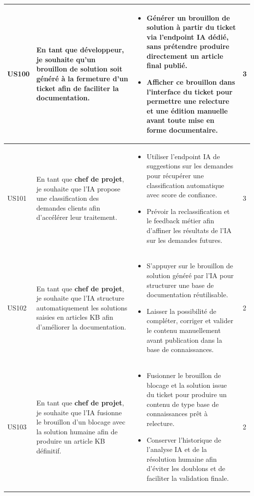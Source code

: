 \begin{longtable}{|C{1cm}|L{5.6cm}|L{8cm}|C{0.85cm}|}
US100 & En tant que \textbf{développeur}, je souhaite qu'un brouillon de solution soit généré à la fermeture d'un ticket afin de faciliter la documentation. &
\begin{itemize}[nosep, left=0pt, label={$\bullet$}]
\item Générer un brouillon de solution à partir du ticket via l'endpoint IA dédié, sans prétendre produire directement un article final publié.
\item Afficher ce brouillon dans l'interface du ticket pour permettre une relecture et une édition manuelle avant toute mise en forme documentaire.
\end{itemize} & 3 \\
\hline

US101 & En tant que \textbf{chef de projet}, je souhaite que l'IA propose une classification des demandes clients afin d'accélérer leur traitement. &
\begin{itemize}[nosep, left=0pt, label={$\bullet$}]
\item Utiliser l'endpoint IA de suggestions sur les demandes pour récupérer une classification automatique avec score de confiance.
\item Prévoir la reclassification et le feedback métier afin d'affiner les résultats de l'IA sur les demandes futures.
\end{itemize} & 3 \\
\hline

US102 & En tant que \textbf{chef de projet}, je souhaite que l'IA structure automatiquement les solutions saisies en articles KB afin d'améliorer la documentation. &
\begin{itemize}[nosep, left=0pt, label={$\bullet$}]
\item S'appuyer sur le brouillon de solution généré par l'IA pour structurer une base de documentation réutilisable.
\item Laisser la possibilité de compléter, corriger et valider le contenu manuellement avant publication dans la base de connaissances.
\end{itemize} & 2 \\
\hline

US103 & En tant que \textbf{chef de projet}, je souhaite que l'IA fusionne le brouillon d'un blocage avec la solution humaine afin de produire un article KB définitif. &
\begin{itemize}[nosep, left=0pt, label={$\bullet$}]
\item Fusionner le brouillon de blocage et la solution issue du ticket pour produire un contenu de type base de connaissances prêt à relecture.
\item Conserver l'historique de l'analyse IA et de la résolution humaine afin d'éviter les doublons et de faciliter la validation finale.
\end{itemize} & 2 \\
\hline
\end{longtable}
\label{tab:backlog_sprint3_pro}
